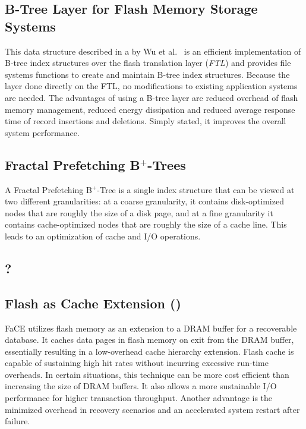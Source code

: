 \documentclass{acm_proc_article-sp}
\begin{document}
\subsection{B-Tree Layer for Flash Memory Storage Systems}
This data structure described in a by Wu et al.~\cite{wu2007efficient} is an efficient implementation of B-tree index structures over the flash translation layer (\emph{FTL}) and provides file systems functions to create and maintain B-tree index structures. Because the layer done directly on the FTL, no modifications to existing application systems are needed. The advantages of using a B-tree layer are reduced overhead of flash memory management, reduced energy dissipation and reduced average response time of record insertions and deletions. Simply stated, it improves the overall system performance. %

\subsection{Fractal Prefetching B$^{+}$-Trees}
A Fractal Prefetching B$^{+}$-Tree \cite{chen2002fractal} is a single index structure that can be viewed at two different granularities: at a coarse granularity, it contains disk-optimized nodes that are roughly the size of a disk page, and at a fine granularity it contains cache-optimized nodes that are roughly the size of a cache line. This leads to an optimization of cache and I/O operations. %

\subsection{?} %

\subsection{Flash as Cache Extension ()}
FaCE \cite{kang2012flash} utilizes flash memory as an extension to a DRAM buffer for a recoverable database. It caches data pages in flash memory on exit from the DRAM buffer, essentially resulting in a low-overhead cache hierarchy extension. Flash cache is capable of sustaining high hit rates without incurring excessive run-time overheads. In certain situations, this technique can be more cost efficient than increasing the size of DRAM buffers. It also allows a more sustainable I/O performance for higher transaction throughput. Another advantage is the minimized overhead in recovery scenarios and an accelerated system restart after failure. %
\end{document}
